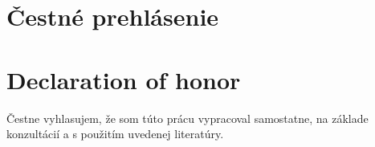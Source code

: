 \thispagestyle{empty}

\vspace*{\fill}

\ifx\FIITlagEN\undefined
\section*{Čestné prehlásenie}
\else
\section*{Declaration of honor}
\fi
\par{
Čestne vyhlasujem, že som túto prácu vypracoval samostatne, na základe konzultácií a s použitím uvedenej literatúry.
\\ 
\\
}
\ifx\FIITlagEN\undefined
\FIITsignPlaceSK \FIITsignDate
\else
\FIITsignPlace \FIITsignDate
\fi
\hspace*{\fill} \signaturespace{5cm}{\FIITauthor}

\emptypage